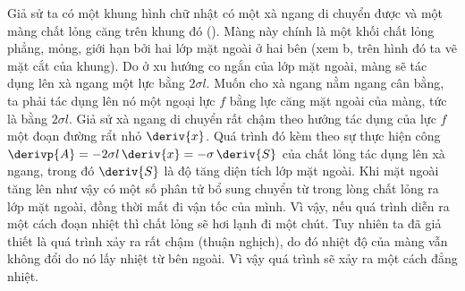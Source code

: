 
Giả sử ta có một khung hình chữ nhật có một xà ngang di chuyển được và một màng chất lỏng căng trên khung đó (). Màng này chính là một khối chất lỏng phẳng, mỏng, giới hạn bởi hai lớp mặt ngoài ở hai bên (xem b, trên hình đó ta vẽ mặt cắt của khung). Do ở xu hướng co ngắn của lớp mặt ngoài, màng sẽ tác dụng lên xà ngang một lực bằng $2\sigma l$. Muốn cho xà ngang nằm ngang cân bằng, ta phải tác dụng lên nó một ngoại lực $f$ bằng lực căng mặt ngoài của màng, tức là bằng $2\sigma l$. Giả sử xà ngang di chuyển rất chậm theo hướng tác dụng của lực $f$ một đoạn đường rẩt nhỏ $\deriv{x}$. Quá trình đó kèm theo sự thực hiện công $\derivp{A}=-2\sigma l\,\deriv{x}=-\sigma\,\deriv{S}$ của chất lỏng tác dụng lên xà ngang, trong đó $\deriv{S}$ là độ tăng diện tích lớp mặt ngoài. Khi mặt ngoài tăng lên như vậy có một số phân tử bổ sung chuyển từ trong lòng chất lỏng ra lớp mặt ngoài, đồng thời mất đi vận tốc của mình. Vì vậy, nếu quá trình diễn ra một cách đoạn nhiệt thì chất lỏng sẽ hơi lạnh đi một chút. Tuy nhiên ta đã giả thiết là quá trình xảy ra rất chậm (thuận nghịch), do đó nhiệt độ của màng vẫn không đổi do nó lấy nhiệt từ bên ngoài. Vì vậy quá trình sẽ xảy ra một cách đẳng nhiệt.


